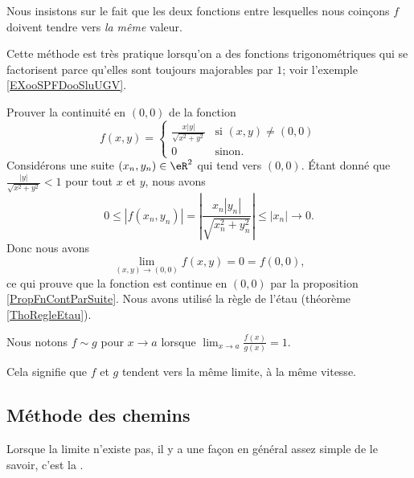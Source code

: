Nous insistons sur le fait que les deux fonctions entre lesquelles nous coinçons $f$ doivent tendre vers \emph{la même} valeur.

Cette méthode est très pratique lorsqu'on a des fonctions trigonométriques qui se factorisent parce qu'elles sont toujours majorables par $1$; voir l'exemple \ref{EXooSPFDooSluUGV}.

\begin{example}
	Prouver la continuité en $(0,0)$ de la fonction
	\begin{equation}
		f(x,y)=\begin{cases}
			\frac{ x | y | }{ \sqrt{x^2+y^2} }	&	\text{si }(x,y)\neq (0,0)\\
			0	&	 \text{sinon.}
		\end{cases}
	\end{equation}
	Considérons une suite $(x_n,y_n)\in\eR^2$ qui tend vers $(0,0)$. Étant donné que $\frac{ | y | }{ \sqrt{x^2+y^2} }<1$ pour tout $x$ et $y$, nous avons
	\begin{equation}
		0\leq | f(x_n,y_n) |=\left| \frac{ x_n | y_n | }{ \sqrt{x_n^2+y_n^2} } \right| \leq | x_n |\to 0.
	\end{equation}
	Donc nous avons
	\begin{equation}
		\lim_{(x,y)\to(0,0)}f(x,y)=0=f(0,0),
	\end{equation}
	ce qui prouve que la fonction est continue en $(0,0)$ par la proposition \ref{PropFnContParSuite}. Nous avons utilisé la règle de l'étau (théorème \ref{ThoRegleEtau}).
\end{example}

\begin{normaltext}
    Nous notons \( f\sim g\) pour \( x\to a\) lorsque \( \lim_{x\to a} \frac{ f(x) }{ g(x) }=1\). 

    Cela signifie que \( f\) et \( g\) tendent vers la même limite, à la même vitesse. 
\end{normaltext}

\subsection{Méthode des chemins}

Lorsque la limite n'existe pas, il y a une façon en général assez simple de le savoir, c'est la .

